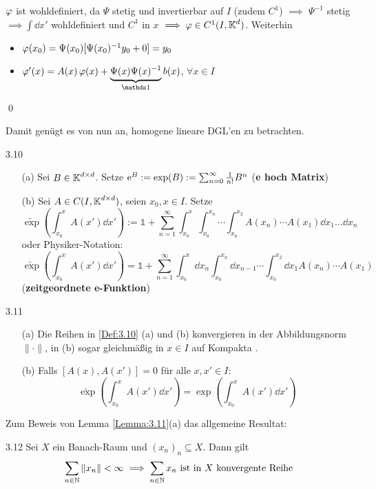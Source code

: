 \documentclass[a4paper]{article}
\begin{document}
\begin{Beweis}
$\operatorname{\varphi}$ ist wohldefiniert, da $\Psi$ stetig und invertierbar auf $I$ (zudem $C^1$) $\implies$ $\Psi^{-1}$ stetig $\implies \int \dd x'$ wohldefiniert und $C^1$ in $x$ $\implies\operatorname{\varphi}\in C^1(I,\operatorname{\mathbb K}^d)$. Weiterhin
\begin{itemize}
\item $\operatorname{\varphi}(x_0)=\Psi(x_0)[\Psi(x_0)^{-1}y_0+0]=y_0$
\item $\vp'(x)=A(x)\vp(x)+\underbrace{\Psi(x)\Psi(x)^{-1}}_{\mathds 1}b(x)$, $\forall x\in I$
\end{itemize}
\qed
\end{Beweis}

Damit genügt es von nun an, homogene lineare DGL'en zu betrachten.

\begin{Def}{}{3.10}
\begin{itemize}
    \item[(a)] Sei $B\in\operatorname{\mathbb K}^{d\times d}$. Setze $\mathrm{e}^B:=\exp(B):=\sum_{n=0}^{\infty}\frac{1}{n!}B^n$ (\textbf{e hoch Matrix})
    \item[(b)] Sei $A\in C(I,\operatorname{\mathbb K}^{d\times d})$, seien $x_0,x\in I$. Setze
    \[\overleftarrow{\exp}\left(\int_{x_0}^xA(x')\dd x'\right):=\mathds1 +\sum_{n=1}^{\infty}\int_{x_0}^x\int_{x_0}^{x_n}\cdots\int_{x_0}^{x_2}A(x_n)\cdots A(x_1)\dd x_1\ldots\dd x_n\]
    oder Physiker-Notation:
    \[\overleftarrow{\exp}\left(\int_{x_0}^xA(x')\dd x'\right)=\mathds 1+\sum_{n=1}^{\infty}\int_{x_0}^x\dd x_n\int_{x_0}^{x_n}\dd x_{n-1}\cdots\int_{x_0}^{x_2}\dd x_1 A(x_n)\cdots A(x_1)\]
    (\textbf{zeitgeordnete e-Funktion})
\end{itemize}
\end{Def}

\begin{Lemma}{}{3.11}
\begin{itemize}
    \item[(a)] Die Reihen in \ref{Def:3.10} (a) und (b) konvergieren in der Abbildungsnorm $\|\cdot\|$, in (b) sogar gleichmäßig in $x\in I$ auf Kompakta .
    \item[(b)] Falls $[A(x),A(x')]=0$ für alle $x,x'\in I$:
    \[\overleftarrow{\exp}\left(\int_{x_0}^xA(x')\dd x'\right)=\exp\left(\int_{x_0}^xA(x')\dd x'\right)\]
\end{itemize}
\end{Lemma}
Zum Beweis von Lemma \ref{Lemma:3.11}(a) das allgemeine Resultat:

\begin{Lemma}{}{3.12}
Sei $X$ ein Banach-Raum und $(x_n)_n\subseteq X$. Dann gilt
\[\sum_{n\in\operatorname{\mathbb N}}\|x_n\|<\infty\implies \sum_{n\in\operatorname{\mathbb N}}x_n\text{ ist in $X$ konvergente Reihe}\]
\end{Lemma}
\end{document}
